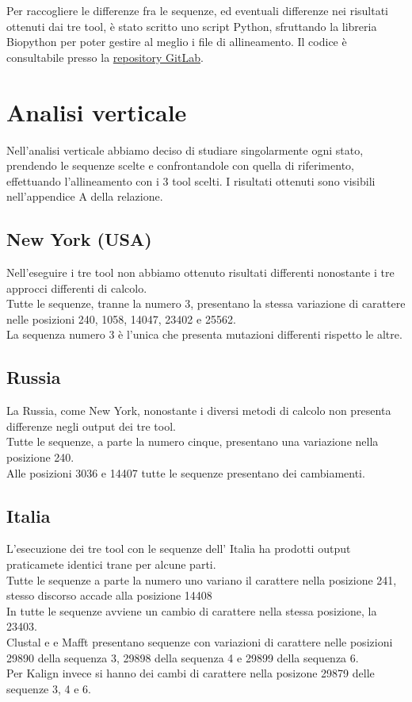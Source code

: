 \documentclass[a4paper,10pt]{article}
\begin{document}
Per raccogliere le differenze fra le sequenze, ed eventuali differenze nei risultati ottenuti dai tre tool, è stato scritto uno script Python, sfruttando la libreria Biopython per poter gestire al meglio i file di allineamento. Il codice è consultabile presso la \textcolor{blue}{\href{https://gitlab.com/i.bettini/bioinformatic}{repository GitLab}}.

\section{Analisi verticale}
Nell'analisi verticale abbiamo deciso di studiare singolarmente ogni stato, prendendo le sequenze scelte e confrontandole con quella di riferimento, effettuando l'allineamento con i 3 tool scelti. I risultati ottenuti sono visibili nell'appendice A della relazione.

\subsection{New York (USA)}
Nell'eseguire i tre tool non abbiamo ottenuto risultati differenti nonostante i tre approcci differenti di calcolo.\\ 

Tutte le sequenze, tranne la numero 3, presentano la stessa variazione di carattere nelle posizioni 240, 1058, 14047, 23402 e 25562.\\
La sequenza numero 3 è l'unica che presenta mutazioni differenti rispetto le altre.

\subsection{Russia}
La Russia, come New York, nonostante i diversi metodi di calcolo non presenta differenze negli output dei tre tool.\\

Tutte le sequenze, a parte la numero cinque, presentano una variazione nella posizione 240.\\
Alle posizioni 3036 e 14407 tutte le sequenze presentano dei cambiamenti.\\

\subsection{Italia}
L'esecuzione dei tre tool con le sequenze dell' Italia ha prodotti output praticamete identici trane per alcune parti.\\
Tutte le sequenze a parte la numero uno variano il carattere nella posizione 241, stesso discorso accade alla posizione 14408\\
In tutte le sequenze avviene un cambio di carattere nella stessa posizione, la 23403.\\
Clustal e e Mafft presentano sequenze con variazioni di carattere nelle posizioni 29890 della sequenza 3, 29898 della sequenza 4 e 29899 della sequenza 6.\\
Per Kalign invece si hanno dei cambi di carattere nella posizone 29879 delle sequenze 3, 4 e 6.\\
\end{document}

